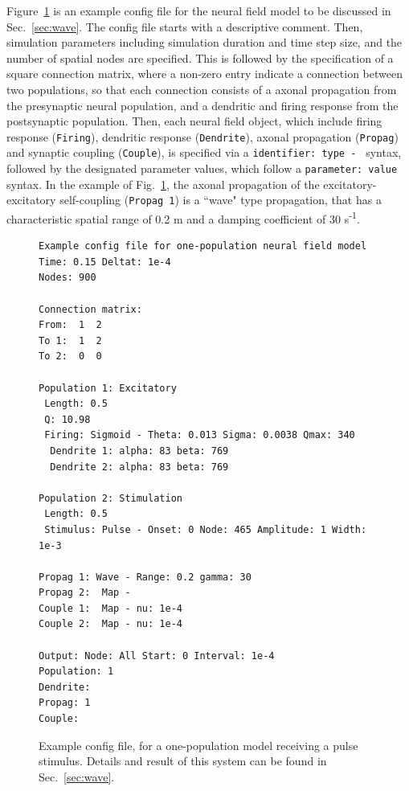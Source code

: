 \documentclass[preprint,review,10pt,authoryear,letterpaper]{elsarticle}
\begin{document}
Figure~\ref{fig:config_text} is an example config file for the neural field model to be discussed in Sec.~\ref{sec:wave}. The config file starts with a descriptive comment. Then, simulation parameters including simulation duration and time step size, and the number of spatial nodes are specified. This is followed by the specification of a square connection matrix, where a non-zero entry indicate a connection between two populations, so that each connection consists of a axonal propagation from the presynaptic neural population, and a dendritic and firing response from the postsynaptic population. Then, each neural field object, which include firing response ({\tt Firing}), dendritic response ({\tt Dendrite}), axonal propagation ({\tt Propag}) and synaptic coupling ({\tt Couple}), is specified via a {\tt identifier: type - } syntax, followed by the designated parameter values, which follow a {\tt parameter: value} syntax. In the example of Fig.~\ref{fig:config_text}, the axonal propagation of the excitatory-excitatory self-coupling ({\tt Propag 1}) is a ``wave" type propagation, that has a characteristic spatial range of 0.2 m and a damping coefficient of 30 s\textsuperscript{-1}.

\begin{figure}[!htbp]
\begin{center}
\begin{lstlisting}
Example config file for one-population neural field model
Time: 0.15 Deltat: 1e-4
Nodes: 900

Connection matrix:
From:  1  2 
To 1:  1  2  
To 2:  0  0  

Population 1: Excitatory
 Length: 0.5
 Q: 10.98
 Firing: Sigmoid - Theta: 0.013 Sigma: 0.0038 Qmax: 340
  Dendrite 1: alpha: 83 beta: 769
  Dendrite 2: alpha: 83 beta: 769

Population 2: Stimulation
 Length: 0.5
 Stimulus: Pulse - Onset: 0 Node: 465 Amplitude: 1 Width: 1e-3 

Propag 1: Wave - Range: 0.2 gamma: 30
Propag 2:  Map -
Couple 1:  Map - nu: 1e-4
Couple 2:  Map - nu: 1e-4

Output: Node: All Start: 0 Interval: 1e-4
Population: 1
Dendrite:  
Propag: 1
Couple:  
\end{lstlisting}
\caption{Example config file, for a one-population model receiving a pulse stimulus. Details and result of this system can be found in Sec.~\ref{sec:wave}.}
\label{fig:config_text}
\end{center}
\end{figure}
\end{document}
